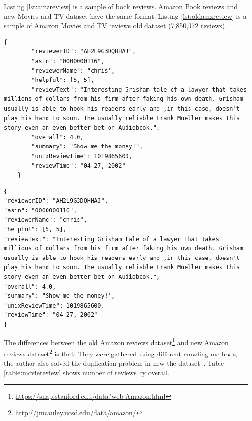 Listing \ref{lst:amzreview} is a sample of book reviews. 
Amazon Book reviews and new Movies and TV dataset have the same format. Listing \ref{lst:oldamzreview} is a sample of Amazon Movies and TV reviews old dataset (7,850,072 reviews). 

\begin{lstlisting}[caption={Amazon reviews sample},label={lst:amzreview}]
    {
        "reviewerID": "AH2L9G3DQHHAJ",
        "asin": "0000000116",
        "reviewerName": "chris",
        "helpful": [5, 5],
        "reviewText": "Interesting Grisham tale of a lawyer that takes millions of dollars from his firm after faking his own death. Grisham usually is able to hook his readers early and ,in this case, doesn't play his hand to soon. The usually reliable Frank Mueller makes this story even an even better bet on Audiobook.",
        "overall": 4.0,
        "summary": "Show me the money!",
        "unixReviewTime": 1019865600,
        "reviewTime": "04 27, 2002"
    }
\end{lstlisting}

\begin{lstlisting}[caption={Old Amazon reviews sample},label={lst:oldamzreview}]
{
"reviewerID": "AH2L9G3DQHHAJ",
"asin": "0000000116",
"reviewerName": "chris",
"helpful": [5, 5],
"reviewText": "Interesting Grisham tale of a lawyer that takes millions of dollars from his firm after faking his own death. Grisham usually is able to hook his readers early and ,in this case, doesn't play his hand to soon. The usually reliable Frank Mueller makes this story even an even better bet on Audiobook.",
"overall": 4.0,
"summary": "Show me the money!",
"unixReviewTime": 1019865600,
"reviewTime": "04 27, 2002"
}
\end{lstlisting}

The differences between the old Amazon reviews dataset\footnote{\url{https://snap.stanford.edu/data/web-Amazon.html}} and new Amazon reviews dataset\footnote{\url{http://jmcauley.ucsd.edu/data/amazon/}} is that: 
They were gathered using different crawling methods, the author also solved the duplication problem in new the dataset~\cite{amazon-reviews}.
Table \ref{table:moviereview} shows number of reviews by overall.

